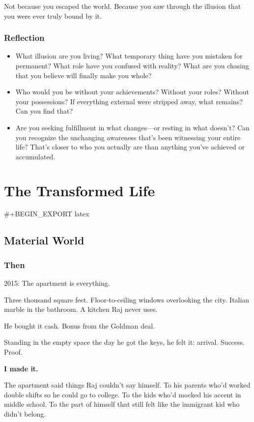 \documentclass[11pt,twoside]{book}
\renewcommand{\thepart}{}
\let\oldpart\part
\renewcommand{\part}[1]{\oldpart{#1}\renewcommand{\thepart}{\relax}}
\begin{document}
Not because you escaped the world. Because you saw through the illusion that you were ever truly bound by it.

\section*{Reflection}

\begin{itemize}
\item What illusion are you living? What temporary thing have you mistaken for permanent? What role have you confused with reality? What are you chasing that you believe will finally make you whole?
\item Who would you be without your achievements? Without your roles? Without your possessions? If everything external were stripped away, what remains? Can you find that?
\item Are you seeking fulfillment in what changes—or resting in what doesn't? Can you recognize the unchanging awareness that's been witnessing your entire life? That's closer to who you actually are than anything you've achieved or accumulated.
\end{itemize}


\part{The Transformed Life}

#+BEGIN_EXPORT latex
\chapter{Material World}

\section*{Then}

2015: The apartment is everything.

Three thousand square feet. Floor-to-ceiling windows overlooking the city. Italian marble in the bathroom. A kitchen Raj never uses.

He bought it cash. Bonus from the Goldman deal.

Standing in the empty space the day he got the keys, he felt it: arrival. Success. Proof.

\textbf{I made it.}

The apartment said things Raj couldn't say himself. To his parents who'd worked double shifts so he could go to college. To the kids who'd mocked his accent in middle school. To the part of himself that still felt like the immigrant kid who didn't belong.
\end{document}

